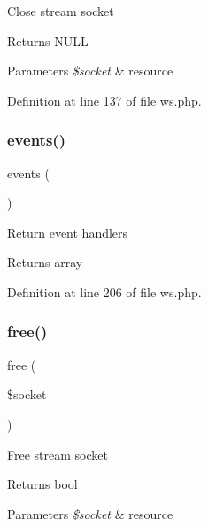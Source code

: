 Close stream socket \begin{DoxyReturn}{Returns}
N\+U\+LL 
\end{DoxyReturn}

\begin{DoxyParams}{Parameters}
{\em \$socket} & resource \\
\hline
\end{DoxyParams}


Definition at line 137 of file ws.\+php.

\hypertarget{class_c_l_i_1_1_w_s_ade509b07f1df45730d31589b81a26efb}{}\label{class_c_l_i_1_1_w_s_ade509b07f1df45730d31589b81a26efb} 
\subsubsection{\texorpdfstring{events()}{events()}}
{\footnotesize\ttfamily events (\begin{DoxyParamCaption}{ }\end{DoxyParamCaption})}

Return event handlers \begin{DoxyReturn}{Returns}
array 
\end{DoxyReturn}


Definition at line 206 of file ws.\+php.

\hypertarget{class_c_l_i_1_1_w_s_a6b8891e0c2b12c863512071111b9aa07}{}\label{class_c_l_i_1_1_w_s_a6b8891e0c2b12c863512071111b9aa07} 
\subsubsection{\texorpdfstring{free()}{free()}}
{\footnotesize\ttfamily free (\begin{DoxyParamCaption}\item[{}]{\$socket }\end{DoxyParamCaption})}

Free stream socket \begin{DoxyReturn}{Returns}
bool 
\end{DoxyReturn}

\begin{DoxyParams}{Parameters}
{\em \$socket} & resource \\
\hline
\end{DoxyParams}


